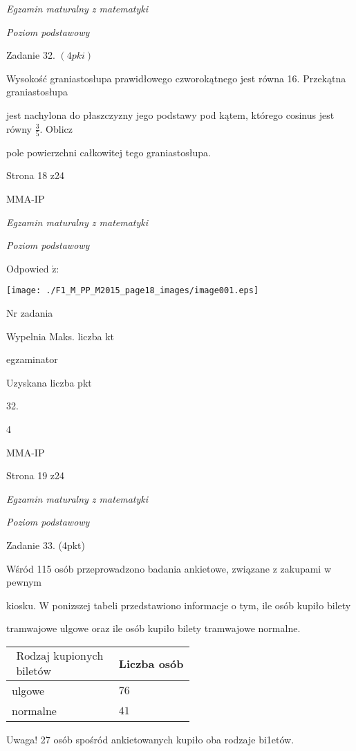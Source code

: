 \documentclass[a4paper,12pt]{article}
\begin{document}
{\it Egzamin maturalny z matematyki}

{\it Poziom podstawowy}

Zadanie 32. $(4pki)$

Wysokość graniastosłupa prawidłowego czworokątnego jest równa 16. Przekątna graniastosłupa

jest nachylona do płaszczyzny jego podstawy pod kątem, którego cosinus jest równy $\displaystyle \frac{3}{5}$. Oblicz

pole powierzchni całkowitej tego graniastosłupa.

Strona 18 z24

MMA-IP





{\it Egzamin maturalny z matematyki}

{\it Poziom podstawowy}

Odpowied $\acute{\mathrm{z}}$:
\begin{center}
\texttt{[image: ./F1\_M\_PP\_M2015\_page18\_images/image001.eps]}
\end{center}
Nr zadania

Wypelnia Maks. liczba kt

egzaminator

Uzyskana liczba pkt

32.

4

MMA-IP

Strona 19 z24





{\it Egzamin maturalny z matematyki}

{\it Poziom podstawowy}

Zadanie 33. (4pkt)

Wśród 115 osób przeprowadzono badania ankietowe, związane z zakupami w pewnym

kiosku. W ponizszej tabeli przedstawiono informacje o tym, ile osób kupiło bilety

tramwajowe ulgowe oraz ile osób kupiło bilety tramwajowe normalne.
\begin{center}
\begin{tabular}{|l|l|}
\hline
\multicolumn{1}{|l|}{$\begin{array}{l}\mbox{Rodzaj kupionych}	\\	\mbox{biletów}	\end{array}$}&	\multicolumn{1}{|l|}{Liczba osób}	\\
\hline
\multicolumn{1}{|l|}{ulgowe}&	\multicolumn{1}{|l|}{$76$}	\\
\hline
\multicolumn{1}{|l|}{normalne}&	\multicolumn{1}{|l|}{$41$}	\\
\hline
\end{tabular}

\end{center}
Uwaga! 27 osób spośród ankietowanych kupiło oba rodzaje bi1etów.
\end{document}
